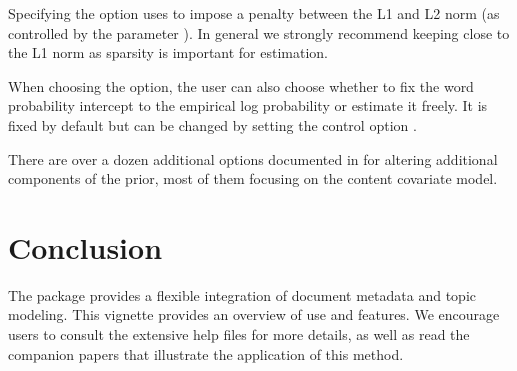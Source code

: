 \documentclass[nojss]{jss}
\begin{document}
Specifying the option  uses  to impose a penalty between the L1 and L2 norm (as controlled by the  parameter ).  In general we strongly recommend keeping close to the L1 norm as sparsity is important for estimation.

When choosing the  option, the user can also choose whether to fix the word probability intercept to the empirical log probability or estimate it freely.  It is fixed by default but can be changed by setting the control option .

There are over a dozen additional options documented in  for altering additional components of the prior, most of them focusing on the content covariate model.

\section{Conclusion}

The   package provides a flexible integration of document metadata and topic modeling. This vignette provides an overview of use and features. We encourage users to consult the extensive help files for more details, as well as read the companion papers that illustrate the application of this method.

\clearpage
{}

\end{document}
